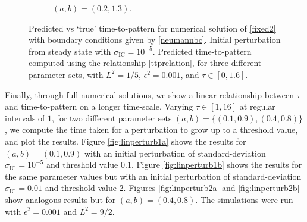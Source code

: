 \begin{figure}[H]
\begin{subfigure}[t]{0.32\textwidth}
        \caption{$(a,b)=(0.2,1.3)$.}
        \label{fig:ttp3}
    \end{subfigure}
    \caption{Predicted vs `true' time-to-pattern for numerical solution of \eqref{fixed2} with boundary conditions given by \eqref{neumannbc}. Initial perturbation from steady state with $\sigma_{\text{IC}}= 10^{-5}$. Predicted time-to-pattern computed using the relationship \eqref{ttprelation}, for three different parameter sets, with $L^2=1/5$, $\epsilon^2=0.001$, and $\tau\in[0,1.6]$.}
    \label{}
\end{figure}

Finally, through full numerical solutions, we show a linear relationship between $\tau$ and time-to-pattern on a longer time-scale. Varying $\tau\in[1,16]$ at regular intervals of $1$, for two different parameter sets $(a,b)=\{(0.1,0.9),(0.4,0.8)\}$, we compute the time taken for a perturbation to grow up to a threshold value, and plot the results. Figure \ref{fig:linperturb1a} shows the results for $(a,b)=(0.1,0.9)$ with an initial perturbation of standard-deviation $\sigma_{\text{IC}}=10^{-5}$ and threshold value $0.1$. Figure \ref{fig:linperturb1b} shows the results for the same parameter values but with an initial perturbation of standard-deviation $\sigma_{\text{IC}}=0.01$ and threshold value $2$. Figures \ref{fig:linperturb2a} and \ref{fig:linperturb2b} show analogous results but for $(a,b)=(0.4,0.8)$. The simulations were run with $\epsilon^2=0.001$ and $L^2=9/2$.
